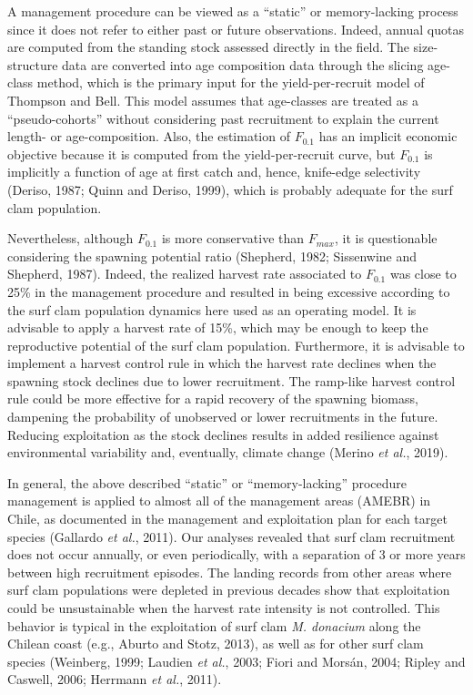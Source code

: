 \documentclass[12pt]{article}
\begin{document}
A management procedure can be viewed as a ``static'' or memory-lacking
process since it does not refer to either past or future observations.
Indeed, annual quotas are computed from the standing stock assessed
directly in the field. The size-structure data are converted into age
composition data through the slicing age-class method, which is the
primary input for the yield-per-recruit model of Thompson and Bell. This
model assumes that age-classes are treated as a ``pseudo-cohorts''
without considering past recruitment to explain the current length- or
age-composition. Also, the estimation of \(F_{0.1}\) has an implicit
economic objective because it is computed from the yield-per-recruit
curve, but \(F_{0.1}\) is implicitly a function of age at first catch
and, hence, knife-edge selectivity (Deriso, 1987; Quinn and Deriso,
1999), which is probably adequate for the surf clam population.

Nevertheless, although \(F_{0.1}\) is more conservative than
\(F_{max}\), it is questionable considering the spawning potential ratio
(Shepherd, 1982; Sissenwine and Shepherd, 1987). Indeed, the realized
harvest rate associated to \(F_{0.1}\) was close to 25\% in the
management procedure and resulted in being excessive according to the
surf clam population dynamics here used as an operating model. It is
advisable to apply a harvest rate of 15\%, which may be enough to keep
the reproductive potential of the surf clam population. Furthermore, it
is advisable to implement a harvest control rule in which the harvest
rate declines when the spawning stock declines due to lower recruitment.
The ramp-like harvest control rule could be more effective for a rapid
recovery of the spawning biomass, dampening the probability of
unobserved or lower recruitments in the future. Reducing exploitation as
the stock declines results in added resilience against environmental
variability and, eventually, climate change (Merino \emph{et al.},
2019).

In general, the above described ``static'' or ``memory-lacking''
procedure management is applied to almost all of the management areas
(AMEBR) in Chile, as documented in the management and exploitation plan
for each target species (Gallardo \emph{et al.}, 2011). Our analyses
revealed that surf clam recruitment does not occur annually, or even
periodically, with a separation of 3 or more years between high
recruitment episodes. The landing records from other areas where surf
clam populations were depleted in previous decades show that
exploitation could be unsustainable when the harvest rate intensity is
not controlled. This behavior is typical in the exploitation of surf
clam \emph{M. donacium} along the Chilean coast (e.g., Aburto and Stotz,
2013), as well as for other surf clam species (Weinberg, 1999; Laudien
\emph{et al.}, 2003; Fiori and Morsán, 2004; Ripley and Caswell, 2006;
Herrmann \emph{et al.}, 2011).
\end{document}
